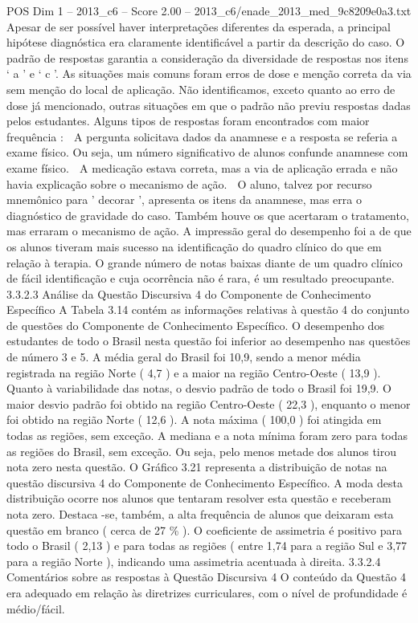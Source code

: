 \begin{textsample}{POS Dim 1 – 2013\_c6 – Score 2.00 – 2013\_c6/enade\_2013\_med\_9c8209e0a3.txt}
Apesar de ser possível haver interpretações diferentes da esperada, a principal hipótese diagnóstica era claramente identificável a partir da descrição do caso.
O padrão de respostas garantia a consideração da diversidade de respostas nos itens ‘ a ’ e ‘ c ’.
As situações mais comuns foram erros de dose e menção correta da via sem menção do local de aplicação.
Não identificamos, exceto quanto ao erro de dose já mencionado, outras situações em que o padrão não previu respostas dadas pelos estudantes.
Alguns tipos de respostas foram encontrados com maior frequência :  A pergunta solicitava dados da anamnese e a resposta se referia a exame físico.
Ou seja, um número significativo de alunos confunde anamnese com exame físico.  A medicação estava correta, mas a via de aplicação errada e não havia explicação sobre o mecanismo de ação.  O aluno, talvez por recurso mnemônico para ' decorar ', apresenta os itens da anamnese, mas erra o diagnóstico de gravidade do caso.
Também houve os que acertaram o tratamento, mas erraram o mecanismo de ação.
A impressão geral do desempenho foi a de que os alunos tiveram mais sucesso na identificação do quadro clínico do que em relação à terapia.
O grande número de notas baixas diante de um quadro clínico de fácil identificação e cuja ocorrência não é rara, é um resultado preocupante. 3.3.2.3 Análise da Questão Discursiva 4 do Componente de Conhecimento Específico A Tabela 3.14 contém as informações relativas à questão 4 do conjunto de questões do Componente de Conhecimento Específico.
O desempenho dos estudantes de todo o Brasil nesta questão foi inferior ao desempenho nas questões de número 3 e 5.
A média geral do Brasil foi 10,9, sendo a menor média registrada na região Norte ( 4,7 ) e a maior na região Centro-Oeste ( 13,9 ).
Quanto à variabilidade das notas, o desvio padrão de todo o Brasil foi 19,9.
O maior desvio padrão foi obtido na região Centro-Oeste ( 22,3 ), enquanto o menor foi obtido na região Norte ( 12,6 ).
A nota máxima ( 100,0 ) foi atingida em todas as regiões, sem exceção.
A mediana e a nota mínima foram zero para todas as regiões do Brasil, sem exceção.
Ou seja, pelo menos metade dos alunos tirou nota zero nesta questão.
O Gráfico 3.21 representa a distribuição de notas na questão discursiva 4 do Componente de Conhecimento Específico.
A moda desta distribuição ocorre nos alunos que tentaram resolver esta questão e receberam nota zero.
Destaca -se, também, a alta frequência de alunos que deixaram esta questão em branco ( cerca de 27 \% ).
O coeficiente de assimetria é positivo para todo o Brasil ( 2,13 ) e para todas as regiões ( entre 1,74 para a região Sul e 3,77 para a região Norte ), indicando uma assimetria acentuada à direita. 3.3.2.4 Comentários sobre as respostas à Questão Discursiva 4 O conteúdo da Questão 4 era adequado em relação às diretrizes curriculares, com o nível de profundidade é médio/fácil.

\end{textsample}
